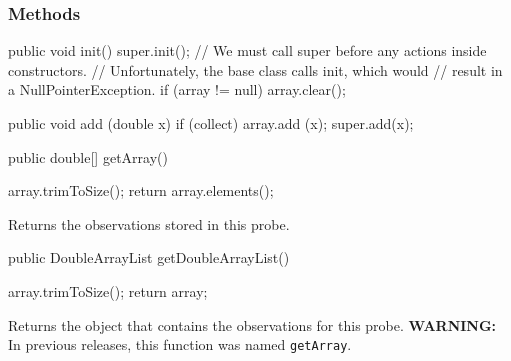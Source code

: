\subsubsection* {Methods}
\begin{code}\begin{hide}

   public void init() {
       super.init();
       // We must call super before any actions inside constructors.
       // Unfortunately, the base class calls init, which would
       // result in a NullPointerException.
       if (array != null)
          array.clear();
   }

   public void add (double x) {
      if (collect) array.add (x);
      super.add(x);
   }\end{hide}

   public double[] getArray() \begin{hide} {
      array.trimToSize();
      return array.elements();
   }\end{hide}
\end{code}
\begin{tabb} Returns the observations stored in this probe.
\end{tabb}
\begin{htmlonly}
\end{htmlonly}
\begin{code}

   public DoubleArrayList getDoubleArrayList() \begin{hide} {
      array.trimToSize();
      return array;
   }\end{hide}
\end{code}
\begin{tabb}  Returns the 
   object that contains the observations for this probe. \textbf{WARNING:}
   In previous releases, this function was named \texttt{getArray}.
\end{tabb}
\begin{htmlonly}
\end{htmlonly}
